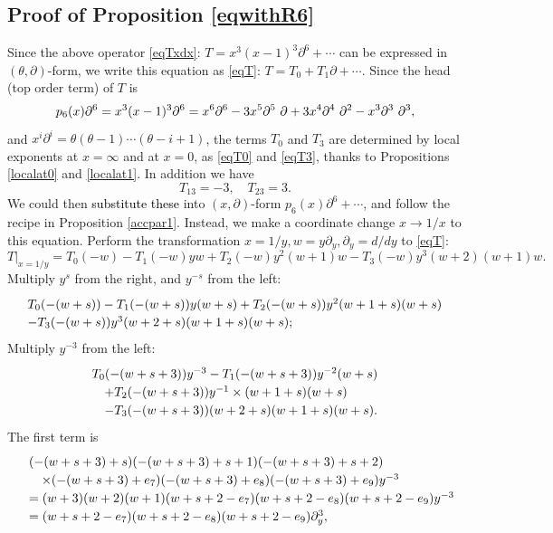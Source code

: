 \documentclass[a4paper,12pt]{article}
\theoremstyle{definition}
\theoremstyle{remark}
\numberwithin{equation}{section} %
\newcommand{\red}[1]{\textcolor{black}{#1}}
\begin{document}
\subsection{Proof of Proposition \ref{eqwithR6}}
  Since the above operator \eqref{eqTxdx}: $T=x^3(x-1)^3\partial^6+\cdots$
  can be expressed in $(\theta,\partial)$-form,
  we write this equation as \eqref{eqT}: $T=T_0+T_1\partial+\cdots$.
  Since the head (top order term) of $T$ is
$$p_6\red{(x)}\partial^6=x^3(x-1)^3\partial^6=x^6\red{\partial^6}-3x^5\partial^5\ \partial+3x^4\partial^4\ \partial^2-x^3\partial^3\ \partial^3,$$
and $x^i\partial^i=\theta(\theta-1)\cdots(\theta-i+1)$, the terms  $T_0$ and $T_3$ are determined by local exponents at $x=\infty$
  and at $x=0$, as \eqref{eqT0} and \eqref{eqT3},
  thanks to Propositions \ref{localat0} and \ref{localat1}. In addition we have $$T_{13}=-3,\quad T_{23}=3.$$
  We could then \red{substitute these} into $(x,\partial)$-form
  $p_6(x)\partial^6+\cdots$,
  and follow the recipe in Proposition \ref{accpar1}.
%
  Instead,  we make a coordinate change $x\to 1/x$ to this equation.
  Perform the transformation $x=1/y,w=y\partial_y, \partial_y=d/dy$
  to \eqref{eqT}: 
$$T|_{x=1/y}=T_0(-w)-T_1(-w)yw+T_2(-w)y^2(w+1)w-T_3(-w)y^3(w+2)(w+1)w.$$
Multiply $y^{s}$ from the right, and $y^{-s}$ from the left:
\[ \def\arraystretch{1.2}\begin{array}{l}
  T_0(-(w+s))-T_1(-(w+s))y(w+s)+T_2(-(w+s))y^2(w+1+s)(w+s)\\
  -T_3(-(w+s))y^3(w+2+s)(w+1+s)(w+s);
\end{array}\]
Multiply $y^{-3}$ from the left:
\begin{equation}\label{atinfty}
  \def\arraystretch{1.2}
  \begin{array}{l}T_0(-(w+s+3))y^{-3}-T_1(-(w+s+3))y^{-2}(w+s)\\
\quad    +T_2(-(w+s+3))y^{-1}\times(w+1+s)(w+s)\\
\quad    -T_3(-(w+s+3))(w+2+s)(w+1+s)(w+s).
\end{array}\end{equation}
The first term is 
\[ \def\arraystretch{1.2} \begin{array}{ll}
  &(-(w+s+3)+s)(-(w+s+3)+s+1)(-(w+s+3)+s+2)\\
  &\quad \times(-(w+s+3)+e_7)(-(w+s+3)+e_8)(-(w+s+3)+e_9)y^{-3}\\
&=(w+3)(w+2)(w+1)(w+s+2-e_7)(w+s+2-e_8)(w+s+2-e_9)y^{-3}\\
  &=(w+s+2-e_7)(w+s+2-e_8)(w+s+2-e_9)\partial_y^3,
\end{array}\]
\end{document}
